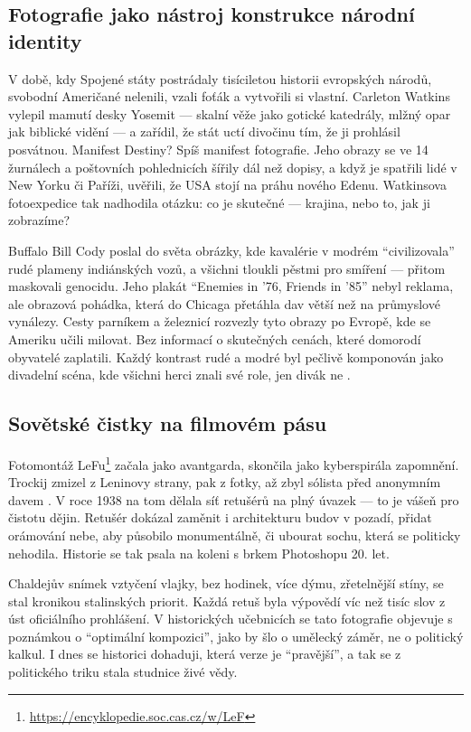 \documentclass[12pt]{article}
\begin{document}
\subsection{Fotografie jako nástroj konstrukce národní identity}
V době, kdy Spojené státy postrádaly tisíciletou historii evropských národů, svobodní Američané nelenili, vzali foťák a 
vytvořili si vlastní. Carleton Watkins vylepil mamutí desky 
Yosemit --- skalní věže jako gotické katedrály, mlžný opar jak biblické vidění --- a zařídil, že stát uctí divočinu tím, 
že ji prohlásil posvátnou. Manifest Destiny? Spíš manifest fotografie. Jeho obrazy se ve 14 žurnálech a poštovních 
pohlednicích šířily dál než dopisy, a když je spatřili lidé v New Yorku či Paříži, uvěřili, že USA stojí na práhu 
nového Edenu. Watkinsova fotoexpedice tak nadhodila otázku: co je skutečné --- krajina, nebo to, jak ji zobrazíme?

Buffalo Bill Cody poslal do světa obrázky, kde kavalérie v modrém \enquote{civilizovala} rudé plameny indiánských vozů, 
a všichni tloukli pěstmi pro smíření --- přitom maskovali genocidu. Jeho plakát \enquote{Enemies in '76, Friends in '85}
nebyl reklama, ale obrazová pohádka, která do Chicaga přetáhla dav větší než na průmyslové vynálezy. Cesty parníkem a 
železnicí rozvezly tyto obrazy po Evropě, kde se Ameriku učili milovat. Bez informací o skutečných cenách, které 
domorodí obyvatelé zaplatili. Každý kontrast rudé a modré byl pečlivě komponován jako divadelní scéna, kde všichni herci 
znali své role, jen divák ne \cite{buffalo}.

\subsection{Sovětské čistky na filmovém pásu}
Fotomontáž LeFu\footnote{\url{https://encyklopedie.soc.cas.cz/w/LeF}} začala jako avantgarda, skončila jako kyberspirála 
zapomnění. Trockij zmizel z Leninovy strany, pak z fotky, až zbyl sólista před anonymním davem \cite{trockij}. V roce 
1938 na tom dělala síť retušérů na plný úvazek --- to je vášeň pro čistotu dějin. Retušér dokázal zaměnit i architekturu 
budov v pozadí, přidat orámování nebe, aby působilo monumentálně, či ubourat sochu, která se politicky nehodila. 
Historie se tak psala na koleni s brkem Photoshopu 20. let.\cite{retus}

Chaldejův snímek vztyčení vlajky\cite{reichstag}, bez hodinek, více dýmu, zřetelnější stíny, se stal kronikou 
stalinských priorit. Každá retuš byla výpovědí víc než tisíc slov z úst oficiálního prohlášení. V historických 
učebnicích se tato fotografie objevuje s poznámkou o \enquote{optimální kompozici}, jako by šlo o umělecký záměr, ne o 
politický kalkul. I dnes se historici dohaduji, která verze je \enquote{pravější}, a tak se z politického triku stala 
studnice živé vědy.
\end{document}
